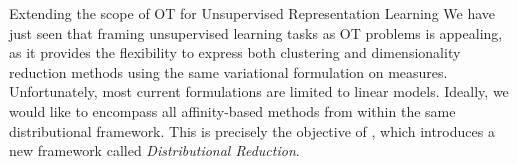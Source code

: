 \vspace{0.5cm}
\begin{prob}{Extending the scope of OT for Unsupervised Representation Learning}\label{prob:ot_unsupervised}
    We have just seen that framing unsupervised learning tasks as OT problems is appealing, as it provides the flexibility to express both clustering and dimensionality reduction methods using the same variational formulation on measures. Unfortunately, most current formulations are limited to linear models. Ideally, we would like to encompass all affinity-based methods from  within the same distributional framework. This is precisely the objective of , which introduces a new framework called \emph{Distributional Reduction}.
\end{prob}
\vspace{0.5cm}


